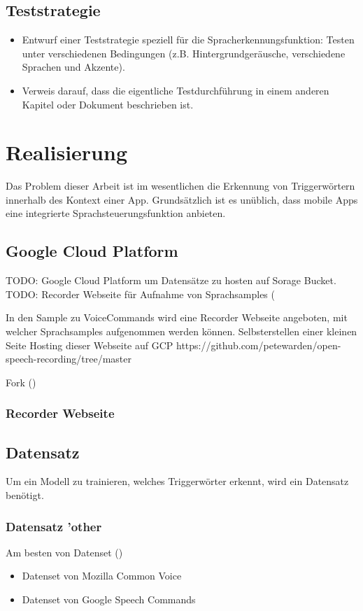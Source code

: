\documentclass[11pt,a4paper]{article}
\begin{document}
\subsection{Teststrategie}
\begin{itemize}
    \item Entwurf einer Teststrategie speziell für die Spracherkennungsfunktion: Testen unter verschiedenen Bedingungen (z.B. Hintergrundgeräusche, verschiedene Sprachen und Akzente).
    \item Verweis darauf, dass die eigentliche Testdurchführung in einem anderen Kapitel oder Dokument beschrieben ist.
\end{itemize}

\newpage \section{Realisierung}
Das Problem dieser Arbeit ist im wesentlichen die Erkennung von Triggerwörtern innerhalb
des Kontext einer App. Grundsätzlich ist es unüblich, dass mobile Apps eine
integrierte Sprachsteuerungsfunktion anbieten.


\subsection{Google Cloud Platform}
TODO: Google Cloud Platform um Datensätze zu hosten auf Sorage Bucket. 
TODO: Recorder Webseite für Aufnahme von Sprachsamples
(\cite{warden2018speech}

In den Sample zu VoiceCommands wird eine Recorder Webseite angeboten, mit welcher Sprachsamples
aufgenommen werden können. Selbsterstellen einer kleinen Seite Hosting dieser Webseite auf GCP
https://github.com/petewarden/open-speech-recording/tree/master

Fork 
(\cite{warden2018speech})


\subsubsection{Recorder Webseite}

\subsection{Datensatz}
Um ein Modell zu trainieren, welches Triggerwörter erkennt, wird ein Datensatz benötigt.

\subsubsection{Datensatz 'other}
Am besten von Datenset (\cite{warden2018speech})
\begin{itemize}
    \item Datenset von Mozilla Common Voice
    \item Datenset von Google Speech Commands
\end{itemize}
\end{document}
